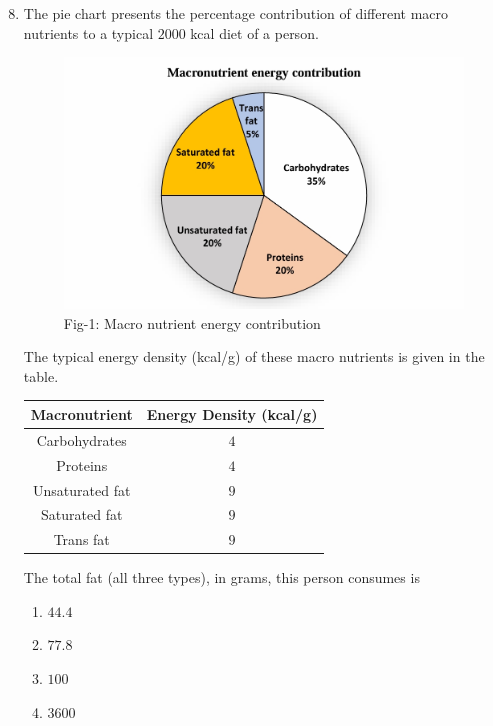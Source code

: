 \documentclass[journal]{IEEEtran}
\theoremstyle{remark}
\begin{document}
\begin{enumerate}[itemsep=1em]
\setcounter{enumi}{7}

\newpage
\vspace*{0.25cm}

\item The pie chart presents the percentage contribution of different macro nutrients to a typical $2000$ kcal diet of a person.
\begin{figure}[H]
    \centering
    \includegraphics[width=0.5\columnwidth]{figs/fig-1.jpeg}
    \caption*{Fig-1: Macro nutrient energy contribution}
    \label{fig-1}
\end{figure}
The typical energy density (kcal/g) of these macro nutrients is given in the table.  

\begin{table}[h]
\centering
\begin{tabular}{|c|c|} 
\hline
\textbf{Macronutrient} & \textbf{Energy Density (kcal/g)}\\ 
\hline
Carbohydrates & $4$\\ \hline
Proteins & $4$\\ \hline
Unsaturated fat & $9$\\ \hline
Saturated fat & $9$\\ \hline
Trans fat & $9$\\ \hline
\end{tabular}
\end{table}
The total fat (all three types), in grams, this person consumes is 
\begin{multicols}{4}
\begin{enumerate}
         \item $44.4$
         \item $77.8$
         \item $100$
         \item $3600$
    \end{enumerate}
\end{multicols}

\end{enumerate}
\end{document}
